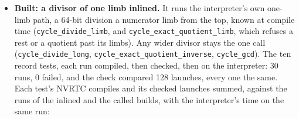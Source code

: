 \begin{enumerate}
\begin{itemize}
2,897 of the 2,904 division sites in those programs divide by one limb, and a call saves every live register around it. Copying the operands out kept the steps' own arrays in registers and was slower still. nvcc's fast compile (\texttt{-\allowbreak{}-\allowbreak{}Ofast-\allowbreak{}compile=mid}) built the 1,012-step program in 21.7 s, and its tower launches took 241.0 ms in one run (the interpreter's 409.7 ms).
\item \textbf{Built: a divisor of one limb inlined.} It runs the interpreter's own one-limb path, a 64-bit division a numerator limb from the top, known at compile time (\texttt{cycle\_\allowbreak{}divide\_\allowbreak{}limb}, and \texttt{cycle\_\allowbreak{}exact\_\allowbreak{}quotient\_\allowbreak{}limb}, which refuses a rest or a quotient past its limbs). Any wider divisor stays the one call (\texttt{cycle\_\allowbreak{}divide\_\allowbreak{}long}, \texttt{cycle\_\allowbreak{}exact\_\allowbreak{}quotient\_\allowbreak{}inverse}, \texttt{cycle\_\allowbreak{}gcd}). The ten record tests, each run compiled, then checked, then on the interpreter: 30 runs, 0 failed, and the check compared 128 launches, every one the same. Each test's NVRTC compiles and its checked launches summed, against the runs of the inlined and the called builds, with the interpreter's time on the same run:


\end{itemize}
\end{enumerate}
